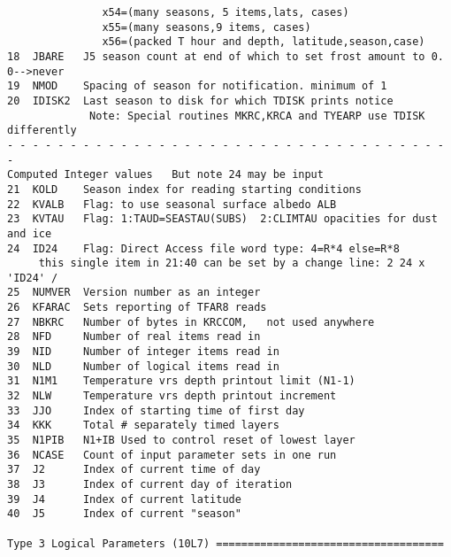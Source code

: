 \documentclass{article}
\begin{document}
\begin{verbatim}
               x54=(many seasons, 5 items,lats, cases)
               x55=(many seasons,9 items, cases)
               x56=(packed T hour and depth, latitude,season,case)
18  JBARE   J5 season count at end of which to set frost amount to 0. 0-->never
19  NMOD    Spacing of season for notification. minimum of 1
20  IDISK2  Last season to disk for which TDISK prints notice
             Note: Special routines MKRC,KRCA and TYEARP use TDISK differently
- - - - - - - - - - - - - - - - - - - - - - - - - - - - - - - - - - - - 
Computed Integer values   But note 24 may be input
21  KOLD    Season index for reading starting conditions
22  KVALB   Flag: to use seasonal surface albedo ALB
23  KVTAU   Flag: 1:TAUD=SEASTAU(SUBS)  2:CLIMTAU opacities for dust and ice
24  ID24    Flag: Direct Access file word type: 4=R*4 else=R*8
     this single item in 21:40 can be set by a change line: 2 24 x 'ID24' /
25  NUMVER  Version number as an integer
26  KFARAC  Sets reporting of TFAR8 reads
27  NBKRC   Number of bytes in KRCCOM,   not used anywhere
28  NFD     Number of real items read in
39  NID     Number of integer items read in
30  NLD     Number of logical items read in
31  N1M1    Temperature vrs depth printout limit (N1-1)
32  NLW     Temperature vrs depth printout increment
33  JJO     Index of starting time of first day
34  KKK     Total # separately timed layers
35  N1PIB   N1+IB Used to control reset of lowest layer
36  NCASE   Count of input parameter sets in one run
37  J2      Index of current time of day
38  J3      Index of current day of iteration
39  J4      Index of current latitude
40  J5      Index of current "season"

Type 3 Logical Parameters (10L7) ====================================


\end{verbatim}
\end{document}
